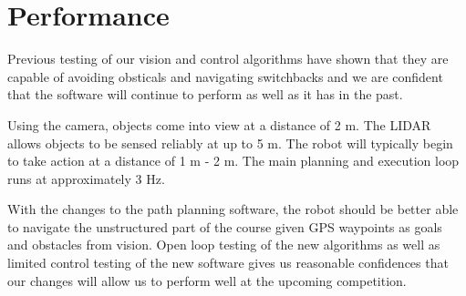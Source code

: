 \section{Performance}

Previous testing of our vision and control algorithms have shown that they are capable of avoiding obsticals and navigating switchbacks and we are confident that the software will continue to perform as well as it has in the past.

Using the camera, objects come into view at a distance of 2 m. The LIDAR allows objects to be sensed reliably at up to 5 m. The robot will typically begin to take action at a distance of 1 m - 2 m. The main planning and execution loop runs at approximately 3 Hz.

With the changes to the path planning software, the robot should be better able to navigate the unstructured part of the course given GPS waypoints as goals and obstacles from vision. Open loop testing of the new algorithms as well as limited control testing of the new software gives us reasonable confidences that our changes will allow us to perform well at the upcoming competition. 
